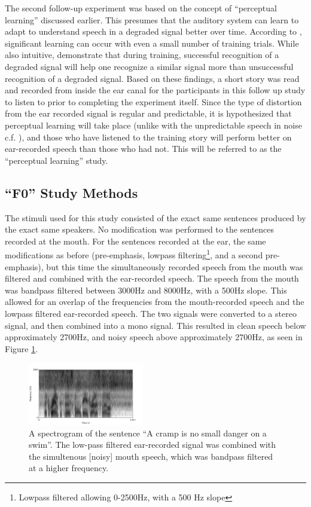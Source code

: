 \documentclass[dissertation,copyright]{uathesis}
\begin{document}
The second follow-up experiment was based on the concept of ``perceptual learning'' discussed earlier.  This presumes that the auditory system can learn to adapt to understand speech in a degraded signal better over time.  According to \cite{mattys:12}, significant learning can occur with even a small number of training trials. While also intuitive, \cite{davis:05} demonstrate that during training, successful recognition of a degraded signal will help one recognize a similar signal more than unsuccessful recognition of a degraded signal.  Based on these findings, a short story was read and recorded from inside the ear canal for the participants in this follow up study to listen to prior to completing the experiment itself.  Since the type of distortion from the ear recorded signal is regular and predictable, it is hypothesized that perceptual learning will take place (unlike with the unpredictable speech in noise c.f. \cite{peelle:05}), and those who have listened to the training story will perform better on ear-recorded speech than those who had not. This will be referred to as the ``perceptual learning'' study.


\subsection{``F0'' Study Methods}
\label{F0-methods}

The stimuli used for this study consisted of the exact same sentences produced by the exact same speakers.  No modification was performed to the sentences recorded at the mouth.  For the sentences recorded at the ear, the same modifications as before (pre-emphasis, lowpass filtering\footnote{Lowpass filtered allowing 0-2500Hz, with a 500 Hz slope}, and a second pre-emphasis), but this time the simultaneously recorded speech from the mouth was filtered and combined with the ear-recorded speech.  The speech from the mouth was bandpass filtered between 3000Hz and 8000Hz, with a 500Hz slope.  This allowed for an overlap of the frequencies from the mouth-recorded speech and the lowpass filtered ear-recorded speech.  The two signals were converted to a stereo signal, and then combined into a mono signal.  This resulted in clean speech below approximately 2700Hz, and noisy speech above approximately 2700Hz, as seen in Figure \ref{fig:combined-signal}.
%
\begin{figure}
\centering
  \includegraphics[width=0.45\textwidth]{figure/combined-signal.png}
  \caption{A spectrogram of the sentence ``A cramp is no small danger on a swim''.  The low-pass filtered ear-recorded signal was combined with the simultenous [noisy] mouth speech, which was bandpass filtered at a higher frequency.}
  \label{fig:combined-signal}
\end{figure}
%
\end{document}
